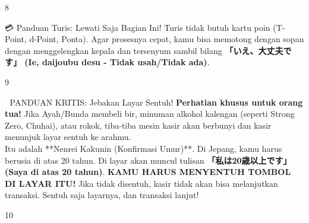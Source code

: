 \begin{convobox}{8}
    \noindent
     

    \vspace{1.5em}
\end{convobox}

\begin{lessonbox}{💳 Panduan Turis: Lewati Saja Bagian Ini!}
    Turis tidak butuh kartu poin (T-Point, d-Point, Ponta). Agar prosesnya cepat, kamu bisa memotong dengan sopan dengan menggelengkan kepala dan tersenyum sambil bilang \textbf{「いえ、大丈夫です」 (Ie, daijoubu desu - Tidak usah/Tidak ada)}.
\end{lessonbox}

\begin{convobox}{9}
    \noindent
       

    \vspace{1.5em}
\end{convobox}

\begin{lessonbox}{🚨 PANDUAN KRITIS: Jebakan Layar Sentuh!}
    \textbf{Perhatian khusus untuk orang tua!} Jika Ayah/Bunda membeli bir, minuman alkohol kalengan (seperti Strong Zero, Chuhai), atau rokok, tiba-tiba mesin kasir akan berbunyi dan kasir menunjuk layar sentuh ke arahmu. \\
    
    Itu adalah **Nenrei Kakunin (Konfirmasi Umur)**. Di Jepang, kamu harus berusia di atas 20 tahun. Di layar akan muncul tulisan \textbf{「私は20歳以上です」 (Saya di atas 20 tahun)}. \textbf{KAMU HARUS MENYENTUH TOMBOL DI LAYAR ITU!} Jika tidak disentuh, kasir tidak akan bisa melanjutkan transaksi. Sentuh saja layarnya, dan transaksi lanjut!
\end{lessonbox}

\begin{convobox}{10}
    \noindent
      

    \vspace{1.5em}
\end{convobox}

